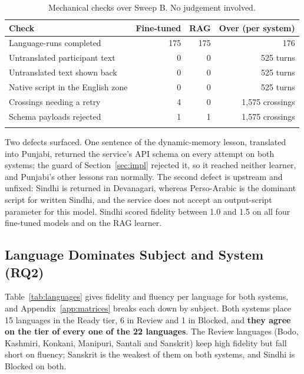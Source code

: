 \documentclass[pdflatex,sn-mathphys-num]{sn-jnl}%
\theoremstyle{thmstyleone}%
\theoremstyle{thmstyletwo}%
\theoremstyle{thmstylethree}%
\begin{document}
\begin{table}[t]
\caption{Mechanical checks over Sweep B. No judgement involved.}\label{tab:mechanical}
\footnotesize
\begin{tabular*}{\textwidth}{@{\extracolsep\fill}lrrr}
\toprule
Check & Fine-tuned & RAG & Over (per system) \\
\midrule
Language-runs completed & 175 & 175 & 176 \\
Untranslated participant text & 0 & 0 & 525 turns \\
Untranslated text shown back & 0 & 0 & 525 turns \\
Native script in the English zone & 0 & 0 & 525 turns \\
Crossings needing a retry & 4 & 0 & 1,575 crossings \\
Schema payloads rejected & 1 & 1 & 1,575 crossings \\
\botrule
\end{tabular*}
\end{table}

Two defects surfaced. One sentence of the dynamic-memory lesson, translated into Punjabi, returned the
service's API schema on every attempt on both systems; the guard of Section~\ref{sec:impl} rejected
it, so it reached neither learner, and Punjabi's other lessons ran normally. The second defect is
upstream and unfixed: Sindhi is returned in Devanagari, whereas Perso-Arabic is the dominant script
for written Sindhi, and the service does not accept an output-script parameter for this model. Sindhi
scored fidelity between 1.0 and 1.5 on all four fine-tuned models and on the RAG learner.

\subsection{Language Dominates Subject and System (RQ2)}\label{sec:res-languages}

Table~\ref{tab:languages} gives fidelity and fluency per language for both systems, and
Appendix~\ref{app:matrices} breaks each down by subject. Both systems place 15 languages in the Ready
tier, 6 in Review and 1 in Blocked, and \textbf{they agree on the tier of every one of the 22
languages}. The Review languages (Bodo, Kashmiri, Konkani, Manipuri, Santali and Sanskrit) keep high
fidelity but fall short on fluency; Sanskrit is the weakest of them on both systems, and Sindhi is
Blocked on both.
\end{document}
